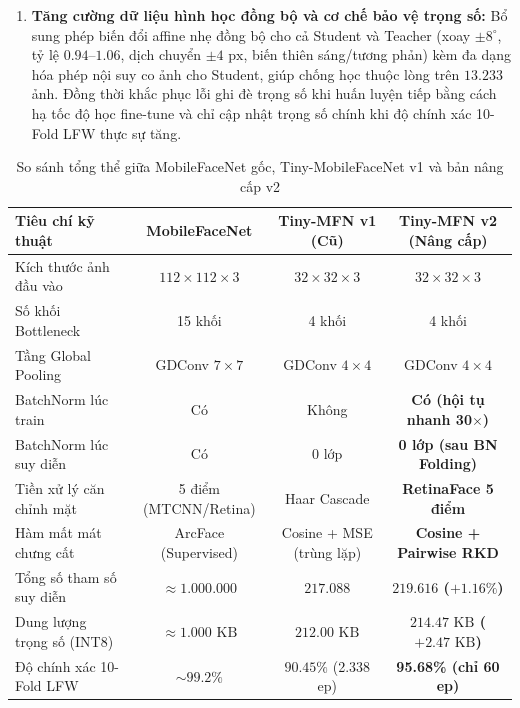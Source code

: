 \documentclass[11pt,a4paper]{article}
\begin{document}
\begin{enumerate}
    \item \textbf{Tăng cường dữ liệu hình học đồng bộ và cơ chế bảo vệ trọng số:}
    Bổ sung phép biến đổi affine nhẹ đồng bộ cho cả Student và Teacher (xoay $\pm 8^\circ$, tỷ lệ $0.94\text{--}1.06$, dịch chuyển $\pm 4\text{ px}$, biến thiên sáng/tương phản) kèm đa dạng hóa phép nội suy co ảnh cho Student, giúp chống học thuộc lòng trên $13.233$ ảnh. Đồng thời khắc phục lỗi ghi đè trọng số khi huấn luyện tiếp bằng cách hạ tốc độ học fine-tune và chỉ cập nhật trọng số chính khi độ chính xác 10-Fold LFW thực sự tăng.
\end{enumerate}

\begin{table}[H]
\centering
\caption{So sánh tổng thể giữa MobileFaceNet gốc, Tiny-MobileFaceNet v1 và bản nâng cấp v2}
\label{tab:arch_compare}
\vspace{0.3em}
\begin{tabular}{lccc}
\toprule
\textbf{Tiêu chí kỹ thuật} & \textbf{MobileFaceNet} & \textbf{Tiny-MFN v1 (Cũ)} & \textbf{Tiny-MFN v2 (Nâng cấp)} \\
\midrule
Kích thước ảnh đầu vào & $112 \times 112 \times 3$ & $32 \times 32 \times 3$ & $32 \times 32 \times 3$ \\
Số khối Bottleneck & 15 khối & 4 khối & 4 khối \\
Tầng Global Pooling & GDConv $7 \times 7$ & GDConv $4 \times 4$ & GDConv $4 \times 4$ \\
BatchNorm lúc train & Có & Không & \textbf{Có (hội tụ nhanh 30$\times$)} \\
BatchNorm lúc suy diễn & Có & 0 lớp & \textbf{0 lớp (sau BN Folding)} \\
Tiền xử lý căn chỉnh mặt & 5 điểm (MTCNN/Retina) & Haar Cascade & \textbf{RetinaFace 5 điểm} \\
Hàm mất mát chưng cất & ArcFace (Supervised) & Cosine + MSE (trùng lặp) & \textbf{Cosine + Pairwise RKD} \\
Tổng số tham số suy diễn & $\approx 1.000.000$ & $217.088$ & \textbf{$219.616$ ($+1.16\%$)} \\
Dung lượng trọng số (INT8) & $\approx 1.000\text{ KB}$ & $212.00\text{ KB}$ & \textbf{$214.47\text{ KB}$ ($+2.47\text{ KB}$)} \\
Độ chính xác 10-Fold LFW & $\sim 99.2\%$ & $90.45\%$ (2.338 ep) & \textbf{95.68\% (chỉ 60 ep)} \\
\bottomrule
\end{tabular}
\end{table}
\end{document}
